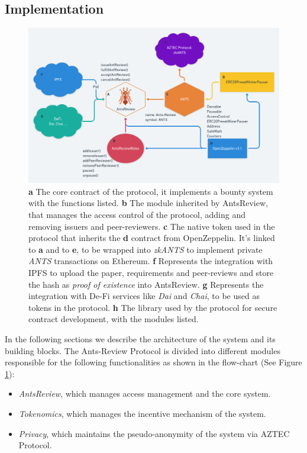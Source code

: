 \documentclass[runningheads]{llncs}
\begin{document}
\subsection{Implementation}

\begin{figure}
\centering
\includegraphics[scale=0.28]{AntsReview}
\caption{\textbf{a} The core contract of the protocol, it implements a bounty system with the functions listed.
\textbf{b} The module inherited by AntsReview, that manages the access control of the protocol, adding and removing issuers and peer-reviewers.
\textbf{c} The native token used in the protocol that inherits the \textbf{d} contract from OpenZeppelin. It's linked to \textbf{a} and to \textbf{e}, to be wrapped into \emph{zkANTS} to implement private \emph{ANTS} transactions on Ethereum.
\textbf{f} Represents the integration with IPFS to upload the paper, requirements and peer-reviews and store the hash as \emph{proof of existence} into AntsReview.
\textbf{g} Represents the integration with De-Fi services like \emph{Dai} and \emph{Chai}, to be used as tokens in the protocol.
\textbf{h} The library used by the protocol for secure contract development, with the modules listed.}
\label{fig:contracts}
\end{figure}

In the following sections we describe the architecture of the system and its building blocks.
\newline The Ants-Review Protocol is divided into different modules responsible for the following functionalities as shown in the flow-chart (See Figure \ref{fig:contracts}):

\begin{itemize}
\item \emph{AntsReview}, which manages access management and the core system.
\item \emph{Tokenomics}, which manages the incentive mechanism of the system.
\item \emph{Privacy}, which maintains the pseudo-anonymity of the system via AZTEC Protocol.
\end{itemize}
\end{document}
